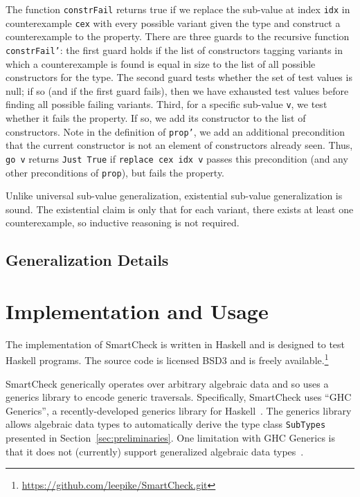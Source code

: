 \documentclass[10pt]{sigplanconf}
\newcommand{\ttp}[1]{\texttt{#1}}
\begin{document}
The function \ttp{constrFail} returns true if we replace the sub-value at index
\ttp{idx} in counterexample \ttp{cex} with every possible variant given the type
and construct a counterexample to the property.  There are three guards to the
recursive function \ttp{constrFail'}: the first guard holds if the list of
constructors tagging variants in which a counterexample is found is equal in
size to the list of all possible constructors for the type.  The second guard
tests whether the set of test values is null; if so (and if the first guard
fails), then we have exhausted test values before finding all possible failing
variants.  Third, for a specific sub-value \ttp{v}, we test whether it fails the
property.  If so, we add its constructor to the list of constructors.  Note in
the definition of \ttp{prop'}, we add an additional precondition that the
current constructor is not an element of constructors already seen.  Thus,
\ttp{go v} returns \ttp{Just True} if \ttp{replace cex idx v} passes this
precondition (and any other preconditions of \ttp{prop}), but fails the
property.

Unlike universal sub-value generalization, existential sub-value generalization
is sound.  The existential claim is only that for each variant, there exists at
least one counterexample, so inductive reasoning is not required.

\subsection{Generalization Details}


\section{Implementation and Usage}\label{sec:implementation}

The implementation of SmartCheck is written in Haskell and is designed to test
Haskell programs.  The source code is licensed BSD3 and is freely
available.\footnote{\url{https://github.com/leepike/SmartCheck.git}}

SmartCheck generically operates over arbitrary algebraic data and so uses a
generics library to encode generic traversals.  Specifically, SmartCheck uses
``GHC Generics'', a recently-developed generics library for
Haskell~\cite{generics}.  The generics library allows algebraic data types to
automatically derive the type class \ttp{SubTypes} presented in
Section~\ref{sec:preliminaries}.  One limitation with GHC Generics is that it
does not (currently) support generalized algebraic data types~\cite{gadts}.
\end{document}
